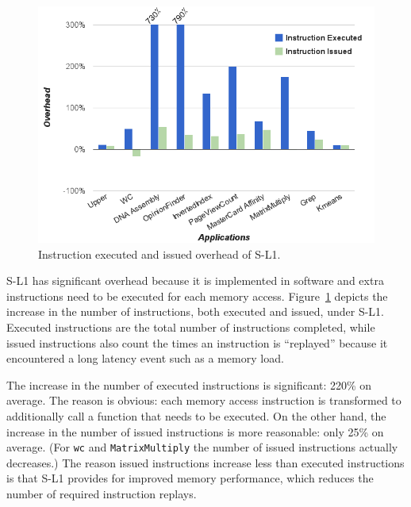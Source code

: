 \begin{figure}[t]
\includegraphics[scale=0.23]{4instructionIssueOverhead.png}
\caption{Instruction executed and issued overhead of S-L1.}
\label{fig:instexecissuedoverhead}
\end{figure}

S-L1 has significant overhead because it is implemented in software and extra instructions need to be executed for each memory access.
Figure~\ref{fig:instexecissuedoverhead} depicts the increase in the number of instructions, both executed and issued, under S-L1.
Executed instructions are the total number of instructions completed, while 
issued instructions also count the times an instruction is ``replayed'' because it
encountered a long latency event such as a memory load.

The increase in the number of executed instructions is significant: 220\% on average. 
The reason is obvious: each memory access instruction is transformed to additionally call a function that needs to be executed. 
On the other hand, the increase in the number of issued instructions is more reasonable:
only 25\% on average. 
(For \texttt{wc} and \texttt{MatrixMultiply} the number of issued instructions actually decreases.)
The reason issued instructions increase less than executed instructions is that S-L1 provides for improved memory performance, which reduces the number of required 
instruction replays.


